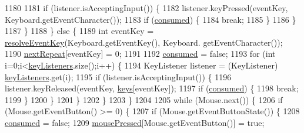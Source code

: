 \begin{DoxyCode}
1180                     
1181                     \textcolor{keywordflow}{if} (listener.isAcceptingInput()) \{
1182                         listener.keyPressed(eventKey, Keyboard.getEventCharacter());
1183                         \textcolor{keywordflow}{if} (\mbox{\hyperlink{classorg_1_1newdawn_1_1slick_1_1_input_af37be3b950898acb03ac33cca068cc9a}{consumed}}) \{
1184                             \textcolor{keywordflow}{break};
1185                         \}
1186                     \}
1187                 \}
1188             \} \textcolor{keywordflow}{else} \{
1189                 \textcolor{keywordtype}{int} eventKey = \mbox{\hyperlink{classorg_1_1newdawn_1_1slick_1_1_input_aa1d5dedd4c21f0031aaf52796fa75237}{resolveEventKey}}(Keyboard.getEventKey(), Keyboard.
      getEventCharacter());
1190                 \mbox{\hyperlink{classorg_1_1newdawn_1_1slick_1_1_input_a7623aa278d694485dd000f6d98d1a515}{nextRepeat}}[eventKey] = 0;
1191                 
1192                 \mbox{\hyperlink{classorg_1_1newdawn_1_1slick_1_1_input_af37be3b950898acb03ac33cca068cc9a}{consumed}} = \textcolor{keyword}{false};
1193                 \textcolor{keywordflow}{for} (\textcolor{keywordtype}{int} i=0;i<\mbox{\hyperlink{classorg_1_1newdawn_1_1slick_1_1_input_a9a68e6a9e9441fea9793f57603be2f96}{keyListeners}}.size();i++) \{
1194                     KeyListener listener = (KeyListener) \mbox{\hyperlink{classorg_1_1newdawn_1_1slick_1_1_input_a9a68e6a9e9441fea9793f57603be2f96}{keyListeners}}.get(i);
1195                     \textcolor{keywordflow}{if} (listener.isAcceptingInput()) \{
1196                         listener.keyReleased(eventKey, \mbox{\hyperlink{classorg_1_1newdawn_1_1slick_1_1_input_a2b4c556098d440654e51cae57d63e429}{keys}}[eventKey]);
1197                         \textcolor{keywordflow}{if} (\mbox{\hyperlink{classorg_1_1newdawn_1_1slick_1_1_input_af37be3b950898acb03ac33cca068cc9a}{consumed}}) \{
1198                             \textcolor{keywordflow}{break};
1199                         \}
1200                     \}
1201                 \}
1202             \}
1203         \}
1204         
1205         \textcolor{keywordflow}{while} (Mouse.next()) \{
1206             \textcolor{keywordflow}{if} (Mouse.getEventButton() >= 0) \{
1207                 \textcolor{keywordflow}{if} (Mouse.getEventButtonState()) \{
1208                     \mbox{\hyperlink{classorg_1_1newdawn_1_1slick_1_1_input_af37be3b950898acb03ac33cca068cc9a}{consumed}} = \textcolor{keyword}{false};
1209                     \mbox{\hyperlink{classorg_1_1newdawn_1_1slick_1_1_input_a83047186fefd663f5749fcdf6bb3b20d}{mousePressed}}[Mouse.getEventButton()] = \textcolor{keyword}{true};

\end{DoxyCode}
